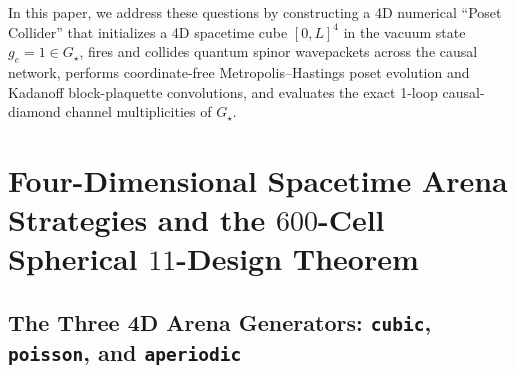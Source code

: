\documentclass[11pt,a4paper]{article}
\theoremstyle{definition}
\theoremstyle{remark}
\newcommand{\Gstar}{G_\star}
\begin{document}
In this paper, we address these questions by constructing a 4D numerical ``Poset Collider'' that initializes a 4D spacetime cube $[0, L]^4$ in the vacuum state $g_e = 1 \in \Gstar$, fires and collides quantum spinor wavepackets across the causal network, performs coordinate-free Metropolis--Hastings poset evolution and Kadanoff block-plaquette convolutions, and evaluates the exact 1-loop causal-diamond channel multiplicities of $\Gstar$.

\section{Four-Dimensional Spacetime Arena Strategies and the \texorpdfstring{$600$-Cell Spherical $11$-Design}{600-Cell Spherical 11-Design} Theorem}
\label{sec:arenas}

\subsection{The Three 4D Arena Generators: \texttt{cubic}, \texttt{poisson}, and \texttt{aperiodic}}
\end{document}
